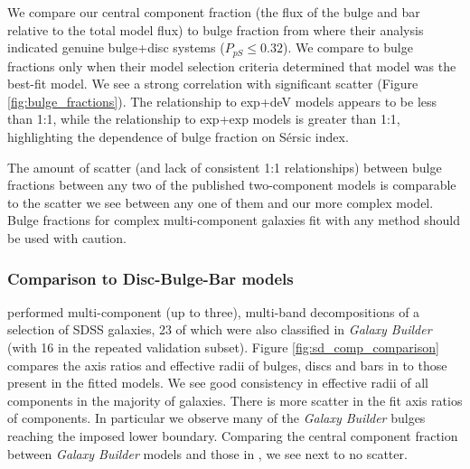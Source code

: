 \documentclass[../main.tex]{subfiles}
\begin{document}
We compare our central component fraction (the flux of the bulge and bar relative to the total model flux) to bulge fraction from \citet{2011ApJS..196...11S} where their analysis indicated genuine bulge+disc systems ($P_{pS} \le 0.32$). We compare to \citet{2012MNRAS.421.2277L} bulge fractions only when their model selection criteria determined that model was the best-fit model. We see a strong correlation with significant scatter (Figure \ref{fig:bulge_fractions}). The relationship to exp+deV models appears to be less than 1:1, while the relationship to exp+exp models is greater than 1:1, highlighting the dependence of bulge fraction on S\'ersic index.

The amount of scatter (and lack of consistent 1:1 relationships) between bulge fractions between any two of the published two-component models is comparable to the scatter we see between any one of them and our more complex model. Bulge fractions for complex multi-component galaxies fit with any method should be used with caution.

\begin{figure*}
  \caption{Scatter plots comparing the ratio of flux from central components (bulge and bar) to the total flux between fitted models from \textit{Galaxy Builder} and two-component models in the literature. Our models are broadly consistent with their results, but should be more accurate for complex galaxies, as we account for galaxy bars.}
  \label{fig:bulge_fractions}
\end{figure*}


\subsubsection{Comparison to Disc-Bulge-Bar models}

\citet{2018MNRAS.473.4731K} performed multi-component (up to three), multi-band decompositions of a selection of SDSS galaxies, 23 of which were also classified in \textit{Galaxy Builder} (with 16 in the repeated validation subset). Figure \ref{fig:sd_comp_comparison} compares the axis ratios and effective radii of bulges, discs and bars in \citet{2018MNRAS.473.4731K} to those present in the fitted models. We see good consistency in effective radii of all components in the majority of galaxies. There is more scatter in the fit axis ratios of components. In particular we observe many of the \textit{Galaxy Builder} bulges reaching the imposed lower boundary. Comparing the central component fraction between \textit{Galaxy Builder} models and those in \citet{2018MNRAS.473.4731K}, we see next to no scatter.
\end{document}
